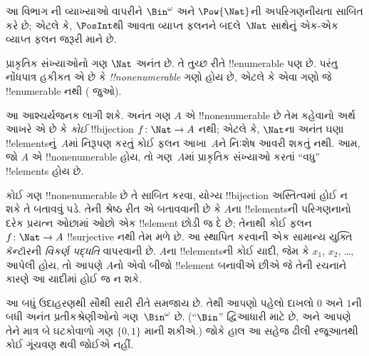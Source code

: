 \documentclass[../../../include/open-logic-section]{subfiles}
\begin{document}


\begin{editorial}
  આ વિભાગ ની વ્યાખ્યાઓ વાપરીને
  $\Bin^\omega$ અને $\Pow{\Nat}$ની અપરિગણનીયતા સાબિત કરે છે;
  એટલે કે, $\PosInt$થી આવતા વ્યાપ્ત ફલનને બદલે~$\Nat$ સાથેનું
  એક-એક વ્યાપ્ત ફલન જરૂરી માને છે.
\end{editorial}

\begin{explain}
પ્રાકૃતિક સંખ્યાઓનો ગણ $\Nat$ અનંત છે. તે તુચ્છ રીતે
!!{enumerable} પણ છે. પરંતુ નોંધપાત્ર હકીકત એ છે કે
\emph{!!{nonenumerable}} ગણો હોય છે, એટલે કે એવા ગણો જે
!!{enumerable} નથી ( જુઓ).

આ આશ્ચર્યજનક લાગી શકે. અનંત ગણ $A$ એ !!{nonenumerable} છે તેમ કહેવાનો
અર્થ આખરે એ છે કે \emph{કોઈ} !!{bijection} $f \colon \Nat \to A$
નથી; એટલે કે, $\Nat$ના અનંત ઘણા !!{element}sનું~$A$માં નિરૂપણ
કરતું કોઈ ફલન આખા~$A$ને નિઃશેષ આવરી શકતું નથી. આમ, જો $A$ એ
!!{nonenumerable} હોય, તો ગણ~$A$માં પ્રાકૃતિક સંખ્યાઓ કરતાં “વધુ”
!!{element}s હોય છે.

કોઈ ગણ !!{nonenumerable} છે તે સાબિત કરવા, યોગ્ય !!{bijection}
અસ્તિત્વમાં હોઈ ન શકે તે બતાવવું પડે. તેની શ્રેષ્ઠ રીત એ બતાવવાની
છે કે $A$ના !!{element}sની પરિગણનાનો દરેક પ્રયત્ન ઓછામાં ઓછો એક
!!{element} છોડી જ દે છે; તેનાથી કોઈ ફલન $f\colon \Nat \to A$
!!{surjective} નથી તેમ મળે છે. આ સ્થાપિત કરવાની એક સામાન્ય યુક્તિ
કૅન્ટૉરની \emph{વિકર્ણ પદ્ધતિ} વાપરવાની છે. $A$ના !!{element}sની
કોઈ યાદી, જેમ કે $x_1$, $x_2$, \dots, આપેલી હોય, તો આપણે $A$નો
એવો બીજો !!{element} બનાવીએ છીએ જે તેની રચનાને કારણે આ યાદીમાં
હોઈ જ ન શકે.

આ બધું ઉદાહરણથી સૌથી સારી રીતે સમજાય છે. તેથી આપણો પહેલો દાખલો
$0$ અને $1$ની બધી અનંત પ્રતીકશ્રેણીઓનો ગણ~$\Bin^\omega$ છે.
(“$\Bin$” દ્વિઆધારી માટે છે, અને આપણે તેને માત્ર બે ઘટકોવાળો ગણ
$\{0,1\}$ માની શકીએ.)
જોકે હાલ આ સહેજ ઢીલી રજૂઆતથી કોઈ ગૂંચવણ થવી જોઈએ નહીં.
\end{explain}
\end{document}
